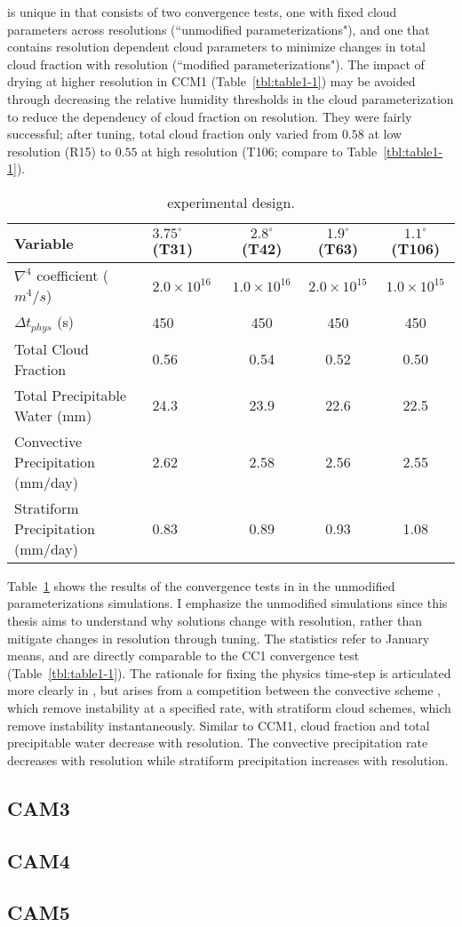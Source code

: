 \cite{WETAL1995CD} is unique in that consists of two convergence tests, one with fixed cloud parameters across resolutions (``unmodified parameterizations"), and one that contains resolution dependent cloud parameters to minimize changes in total cloud fraction with resolution (``modified parameterizations"). The impact of drying at higher resolution in CCM1 (Table~\ref{tbl:table1-1}) may be avoided through decreasing the relative humidity thresholds in the cloud parameterization \citep{KETAL1994JGR} to reduce the dependency of cloud fraction on resolution. They were fairly successful; after tuning, total cloud fraction only varied from $0.58$ at low resolution (R15) to $0.55$ at high resolution (T106; compare to Table~\ref{tbl:table1-1}).

 \begin{table}
 \caption{\cite{WETAL1995CD} experimental design.}
 \centering
 \begin{tabular}{llccc}
 \hline
 Variable & $3.75^{\circ}$ (T31) & $2.8^{\circ}$ (T42) & $1.9^{\circ}$ (T63)  & $1.1^{\circ}$ (T106) \\
 \hline
   $\nabla^{4}$ coefficient ($m^4/s$) & $2.0 \times 10^{16}$ & $1.0 \times 10^{16}$ & $2.0 \times 10^{15}$ & $1.0 \times 10^{15}$ \\
   $\Delta t_{phys}$ (s) & 450 & 450 & 450 & 450 \\
   Total Cloud Fraction & 0.56 & 0.54 & 0.52 & 0.50 \\
   Total Precipitable Water (mm) & 24.3 & 23.9 & 22.6 & 22.5 \\
   Convective Precipitation (mm/day) & 2.62 & 2.58 & 2.56 & 2.55 \\
   Stratiform Precipitation (mm/day) & 0.83 & 0.89 & 0.93 & 1.08 \\   
 \hline
 \end{tabular}
 \label{tbl:table1-2}
 \end{table}

Table~\ref{tbl:table1-2} shows the results of the convergence tests in \cite{WETAL1995CD} in the unmodified parameterizations simulations. I emphasize the unmodified simulations since this thesis aims to understand why solutions change with resolution, rather than mitigate changes in resolution through tuning. The statistics refer to January means, and are directly comparable to the CC1 convergence test (Table~\ref{tbl:table1-1}). The rationale for fixing the physics time-step is articulated more clearly in \cite{W2013QJRMS}, but arises from a competition between the convective scheme \citep[i.e.,;][]{H1994JGR}, which remove instability at a specified rate, with stratiform cloud schemes, which remove instability instantaneously. Similar to CCM1, cloud fraction and total precipitable water decrease with resolution. The convective precipitation rate decreases with resolution while stratiform precipitation increases with resolution.

\subsection{CAM3}
\subsection{CAM4}
\subsection{CAM5}
